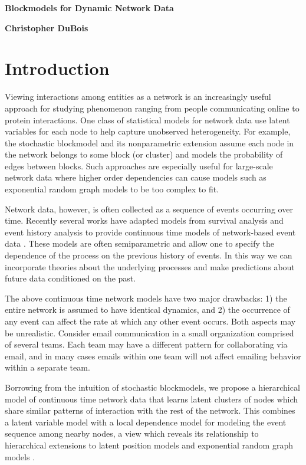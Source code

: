 \documentclass[11pt]{article}
\begin{document}
 

 \centerline{\Large \bf Blockmodels for Dynamic Network Data} 
 \medskip
\centerline{\bf Christopher DuBois}
 \bigskip

\section{Introduction}

Viewing interactions among entities as a network is an increasingly useful approach for studying  phenomenon ranging from people communicating online to protein interactions. One class of statistical models for network data use latent variables for each node to help capture unobserved heterogeneity.  For example, the stochastic blockmodel \cite{Nowicki2001} and its nonparametric extension \cite{Kemp2006} assume each node in the network belongs to some block (or cluster) and models the probability of edges between blocks.   Such approaches are especially useful for large-scale network data where higher order dependencies can cause models such as exponential random graph models to be too complex to fit.%

Network data, however, is often collected as a sequence of events occurring over time.   Recently several works have adapted models from survival analysis and event history analysis to provide continuous time models of network-based event data \cite{Butts2008,Brandes2009,Stadtfeld2010,Stadtfeld2011,Opsahl2011,Vu2011}.  These models are often semiparametric and allow one to specify the dependence of the process on the previous history of events.  In this way we can incorporate theories about the underlying processes and make predictions about future data conditioned on the past.

The above continuous time network models have two major drawbacks: 1) the entire network is assumed to have identical dynamics, and 2) the occurrence of any event can affect the rate at which any other event occurs.  Both aspects may be unrealistic.  Consider email communication in a small organization comprised of several teams.  Each team may have a different pattern for collaborating via email, and in many cases emails within one team will not affect emailing behavior within a separate team.

Borrowing from the intuition of stochastic blockmodels, we propose a hierarchical model of continuous time network data that learns latent clusters of nodes which share similar patterns of interaction with the rest of the network.  This combines a latent variable model with a local dependence model for modeling the event sequence among nearby nodes, a view which reveals its relationship to hierarchical extensions to latent position models \cite{Handcock2007} and exponential random graph models \cite{Schweinberger2011}.
\end{document}
